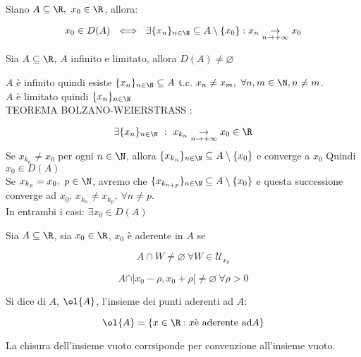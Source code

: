 \documentclass[../appunti.tex]{subfiles}
\begin{document}
\begin{defn} 
Siano $ \acr,\ x_0 \in \R$, allora:


\begin{equation}
	x_0 \in D(A)\ \iff\ \exists \{ x_n \}_{n \in \N} \subseteq A
	\setminus \{ x_0 \}: x_n \underset{\nti}{\to} x_0
\end{equation}

\end{defn}

\begin{defn}
Sia $ \acr $, $A$ infinito e limitato, allora $D(A) \neq \varnothing$ 
\end{defn}

\begin{dimo}
	$A$ è infinito quindi esiste $\{ x_n \}_{n \in \N} \subseteq A$ t.c. 
	$x_n \neq x_m, \ \forall n,m \in \N, n \neq m$.\\
	$A$ è limitato quindi $ \{ x_n \}_{n \in \N}$\\
	 TEOREMA BOLZANO-WEIERSTRASS : 
	
	
	\begin{equation}
		\exists \{ x_n \}_{n \in \N}\ :\ x_{k_n} 
		\underset{\nti}{\to} x_0 \in \R
	\end{equation}
	Se $ x_{k_n} \neq x_0$ per ogni $ n \in \N$, allora 
	$\{ x_{k_n} \}_{n \in \N} \subseteq A \setminus \{x_0\}$ e converge a $x_0$
	Quindi $ x_0 \in D(A) $\\
	Se $ x_{k_p} = x_0,\ p \in \N$, avremo che 
	$\{ x_{k_{n + p}}  \}_{n \in \N} \subseteq A \setminus \{ x_0 \}$ e 
	questa successione converge ad $x_0$. 
	$x_{k_n} \neq x_{k_p},\ \forall n \neq p$.\\
	In entrambi i casi: $ \exists x_0 \in D(A)$
\end{dimo}


\begin{defn}
Sia $\acr$, sia $x_0 \in \R$, $x_0$ è aderente in $A$ se 


\begin{equation}
	A \cap W \neq \varnothing\ \forall W \in \mathcal{U}_{x_0}
\end{equation}
\bda


\begin{equation}
	A \cap ] x_0 - \rho, x_0 + \rho [ \neq \varnothing\ \forall \rho > 0
\end{equation}
\end{defn}


\begin{defn}[Chiusura]
Si dice  di $A$, $\ol{A}$, l'insieme dei punti aderenti ad $A$:


\begin{equation}
	\ol{A} = \{ x \in \R: x \mbox{è aderente ad} A \}
\end{equation}
\end{defn}
La chisura dell'insieme vuoto corrsiponde per convenzione all'insieme vuoto.
\end{document}
